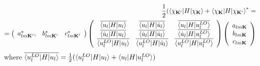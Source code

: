 \documentclass[aps,prb,floatfix,epsfig,singlecolumn,showpacs,preprintnumbers]{revtex4}
\newcommand{\vK}{{\mathbf{K}}}
\begin{document}
\begin{eqnarray}
\frac{1}{2}(\braket{\chi_{\vK'}|H|\chi_\vK}+\braket{\chi_{\vK}|H|\chi_{\vK'}}^*=\\
=
\left(
\begin{array}{ccc}
a_{lm\vK'}^*, & b_{lm\vK'}^* & c^*_{lm\vK'}
\end{array}
\right)
\left(
\begin{array}{ccc}
\overline{\braket{u_l|H|u_l}} & \overline{\braket{u_l|H|\dot{u}_l}} & \overline{\braket{u_l|H|u^{LO}_l}} \\
\overline{\braket{\dot{u}_l|H|u_l}} & \overline{\braket{\dot{u}_l|H|\dot{u}_l}} & \overline{\braket{\dot{u}_l|H|u^{LO}_l}} \\
\overline{\braket{u^{LO}_l|H|u_l}} & \overline{\braket{u^{LO}_l|H|\dot{u}_l}} & \overline{\braket{u^{LO}_l|H|u^{LO}_l}} 
\end{array}
\right)
\left(
\begin{array}{c}
a_{lm\vK}\\
b_{lm\vK}\\ 
c_{lm\vK}
\end{array}
\right)
\end{eqnarray}
where
$\overline{\braket{u^{LO}_l|H|u_l}} = \frac{1}{2}(\braket{u^{LO}_l|H|u_l} +\braket{u_l|H|u^{LO}_l})$
\end{document}
